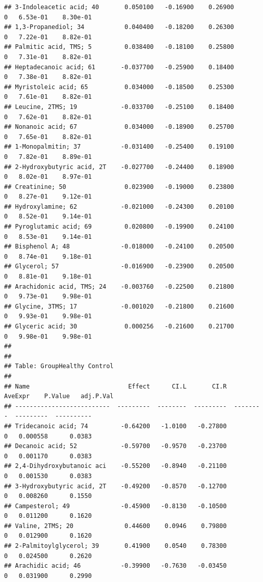 \documentclass[]{article}
\begin{document}
\begin{verbatim}
## 3-Indoleacetic acid; 40       0.050100   -0.16900    0.26900         0   6.53e-01    8.30e-01
## 1,3-Propanediol; 34           0.040400   -0.18200    0.26300         0   7.22e-01    8.82e-01
## Palmitic acid, TMS; 5         0.038400   -0.18100    0.25800         0   7.31e-01    8.82e-01
## Heptadecanoic acid; 61       -0.037700   -0.25900    0.18400         0   7.38e-01    8.82e-01
## Myristoleic acid; 65          0.034000   -0.18500    0.25300         0   7.61e-01    8.82e-01
## Leucine, 2TMS; 19            -0.033700   -0.25100    0.18400         0   7.62e-01    8.82e-01
## Nonanoic acid; 67             0.034000   -0.18900    0.25700         0   7.65e-01    8.82e-01
## 1-Monopalmitin; 37           -0.031400   -0.25400    0.19100         0   7.82e-01    8.89e-01
## 2-Hydroxybutyric acid, 2T    -0.027700   -0.24400    0.18900         0   8.02e-01    8.97e-01
## Creatinine; 50                0.023900   -0.19000    0.23800         0   8.27e-01    9.12e-01
## Hydroxylamine; 62            -0.021000   -0.24300    0.20100         0   8.52e-01    9.14e-01
## Pyroglutamic acid; 69         0.020800   -0.19900    0.24100         0   8.53e-01    9.14e-01
## Bisphenol A; 48              -0.018000   -0.24100    0.20500         0   8.74e-01    9.18e-01
## Glycerol; 57                 -0.016900   -0.23900    0.20500         0   8.81e-01    9.18e-01
## Arachidonic acid, TMS; 24    -0.003760   -0.22500    0.21800         0   9.73e-01    9.98e-01
## Glycine, 3TMS; 17            -0.001020   -0.21800    0.21600         0   9.93e-01    9.98e-01
## Glyceric acid; 30             0.000256   -0.21600    0.21700         0   9.98e-01    9.98e-01
## 
## 
## Table: GroupHealthy Control
## 
## Name                           Effect      CI.L       CI.R   AveExpr    P.Value   adj.P.Val
## --------------------------  ---------  --------  ---------  --------  ---------  ----------
## Tridecanoic acid; 74         -0.64200   -1.0100   -0.27800         0   0.000558      0.0383
## Decanoic acid; 52            -0.59700   -0.9570   -0.23700         0   0.001170      0.0383
## 2,4-Dihydroxybutanoic aci    -0.55200   -0.8940   -0.21100         0   0.001530      0.0383
## 3-Hydroxybutyric acid, 2T    -0.49200   -0.8570   -0.12700         0   0.008260      0.1550
## Campesterol; 49              -0.45900   -0.8130   -0.10500         0   0.011200      0.1620
## Valine, 2TMS; 20              0.44600    0.0946    0.79800         0   0.012900      0.1620
## 2-Palmitoylglycerol; 39       0.41900    0.0540    0.78300         0   0.024500      0.2620
## Arachidic acid; 46           -0.39900   -0.7630   -0.03450         0   0.031900      0.2990

\end{verbatim}
\end{document}
